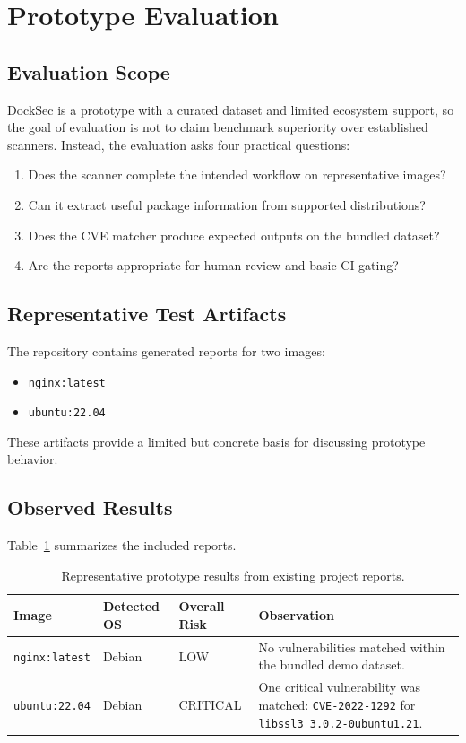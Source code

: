 \documentclass[12pt,draftclsnofoot,onecolumn]{IEEEtran}
\begin{document}
\section{Prototype Evaluation}
\subsection{Evaluation Scope}
DockSec is a prototype with a curated dataset and limited ecosystem support, so the goal of evaluation is not to claim benchmark superiority over established scanners. Instead, the evaluation asks four practical questions:
\begin{enumerate}
  \item Does the scanner complete the intended workflow on representative images?
  \item Can it extract useful package information from supported distributions?
  \item Does the CVE matcher produce expected outputs on the bundled dataset?
  \item Are the reports appropriate for human review and basic CI gating?
\end{enumerate}

\subsection{Representative Test Artifacts}
The repository contains generated reports for two images:
\begin{itemize}
  \item \texttt{nginx:latest}
  \item \texttt{ubuntu:22.04}
\end{itemize}

These artifacts provide a limited but concrete basis for discussing prototype behavior.

\subsection{Observed Results}
Table~\ref{tab:results} summarizes the included reports.

\begin{table}[!t]
\centering
\caption{Representative prototype results from existing project reports.}
\label{tab:results}
\begin{tabular}{p{}p{}p{}p{}}
\toprule
Image & Detected OS & Overall Risk & Observation \\
\midrule
\texttt{nginx:latest} & Debian & LOW & No vulnerabilities matched within the bundled demo dataset. \\
\texttt{ubuntu:22.04} & Debian & CRITICAL & One critical vulnerability was matched: \texttt{CVE-2022-1292} for \texttt{libssl3 3.0.2-0ubuntu1.21}. \\
\bottomrule
\end{tabular}
\end{table}
\end{document}

